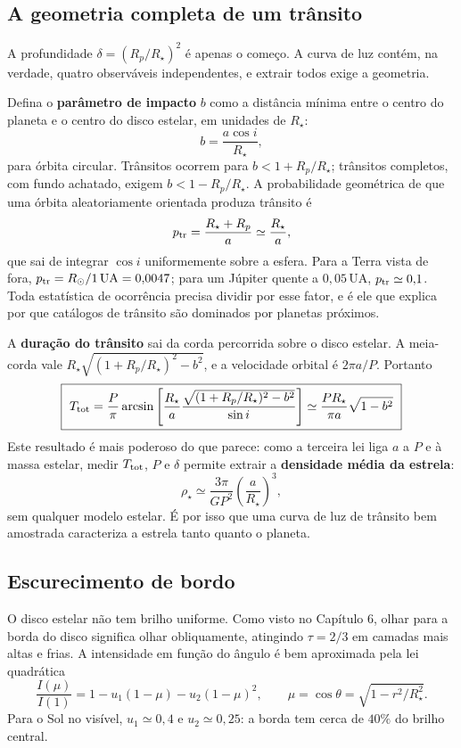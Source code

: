 \documentclass[11pt,a4paper]{article}
\begin{document}
\subsection*{A geometria completa de um trânsito}

A profundidade $\delta=(R_p/R_\star)^{2}$ é apenas o começo. A curva de luz contém, na verdade, quatro observáveis independentes, e extrair todos exige a geometria.

Defina o \textbf{parâmetro de impacto} $b$ como a distância mínima entre o centro do planeta e o centro do disco estelar, em unidades de $R_\star$:
\[
b=\frac{a\cos i}{R_\star},
\]
para órbita circular. Trânsitos ocorrem para $b<1+R_p/R_\star$; trânsitos completos, com fundo achatado, exigem $b<1-R_p/R_\star$. A probabilidade geométrica de que uma órbita aleatoriamente orientada produza trânsito é
\[
p_{\rm tr}=\frac{R_\star+R_p}{a}\simeq\frac{R_\star}{a},
\]
que sai de integrar $\cos i$ uniformemente sobre a esfera. Para a Terra vista de fora, $p_{\rm tr}=R_\odot/1\,\mathrm{UA}=0{,}0047$; para um Júpiter quente a $0{,}05\,\mathrm{UA}$, $p_{\rm tr}\simeq0{,}1$. Toda estatística de ocorrência precisa dividir por esse fator, e é ele que explica por que catálogos de trânsito são dominados por planetas próximos.

A \textbf{duração do trânsito} sai da corda percorrida sobre o disco estelar. A meia-corda vale $R_\star\sqrt{(1+R_p/R_\star)^{2}-b^{2}}$, e a velocidade orbital é $2\pi a/P$. Portanto
\[
\boxed{\ T_{\rm tot}=\frac{P}{\pi}\arcsin\left[\frac{R_\star}{a}\frac{\sqrt{(1+R_p/R_\star)^{2}-b^{2}}}{\sin i}\right]\simeq\frac{PR_\star}{\pi a}\sqrt{1-b^{2}}\ }
\]
Este resultado é mais poderoso do que parece: como a terceira lei liga $a$ a $P$ e à massa estelar, medir $T_{\rm tot}$, $P$ e $\delta$ permite extrair a \textbf{densidade média da estrela}:
\[
\rho_\star\simeq\frac{3\pi}{GP^{2}}\left(\frac{a}{R_\star}\right)^{3},
\]
sem qualquer modelo estelar. É por isso que uma curva de luz de trânsito bem amostrada caracteriza a estrela tanto quanto o planeta.

\subsection*{Escurecimento de bordo}

O disco estelar não tem brilho uniforme. Como visto no Capítulo 6, olhar para a borda do disco significa olhar obliquamente, atingindo $\tau=2/3$ em camadas mais altas e frias. A intensidade em função do ângulo é bem aproximada pela lei quadrática
\[
\frac{I(\mu)}{I(1)}=1-u_1(1-\mu)-u_2(1-\mu)^{2},
\qquad
\mu=\cos\theta=\sqrt{1-r^{2}/R_\star^{2}}.
\]
Para o Sol no visível, $u_1\simeq0{,}4$ e $u_2\simeq0{,}25$: a borda tem cerca de $40\%$ do brilho central.
\end{document}
